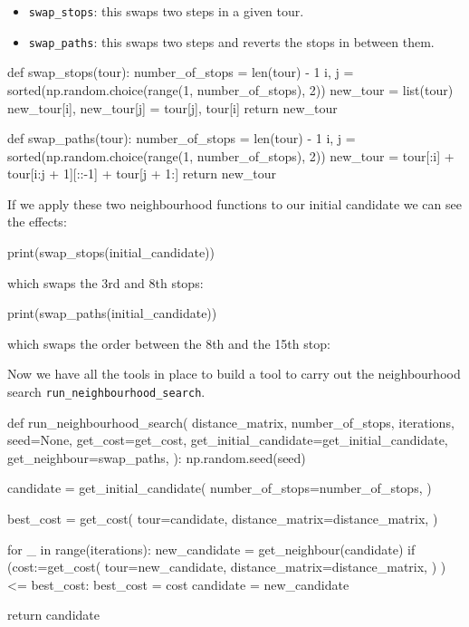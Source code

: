 \begin{itemize}
    \item \texttt{swap_stops}: this swaps two steps in a given tour.
    \item \texttt{swap_paths}: this swaps two steps and reverts the
        stops in between them.
\end{itemize}

\begin{pyin}
def swap_stops(tour):
    number_of_stops = len(tour) - 1
    i, j = sorted(np.random.choice(range(1, number_of_stops), 2))
    new_tour = list(tour)
    new_tour[i], new_tour[j] = tour[j], tour[i]
    return new_tour

def swap_paths(tour):
    number_of_stops = len(tour) - 1
    i, j = sorted(np.random.choice(range(1, number_of_stops), 2))
    new_tour = tour[:i] + tour[i:j + 1][::-1] + tour[j + 1:]
    return new_tour
\end{pyin}

If we apply these two neighbourhood functions to our initial candidate we can
see the effects:

\begin{pyin}
print(swap_stops(initial_candidate))
\end{pyin}

which swaps the 3rd and 8th stops:

\begin{pyout}
[0, 2, 3, 9, 10, 14, 5, 7, 15, 11, 8, 17, 12, 4, 1, 6, 16, 13, 0]
\end{pyout}

\begin{pyin}
print(swap_paths(initial_candidate))
\end{pyin}

which swaps the order between the 8th and the 15th stop:

\begin{pyout}
[0, 2, 7, 9, 10, 14, 5, 3, 6, 1, 4, 12, 17, 8, 11, 15, 16, 13, 0]
\end{pyout}


Now we have all the tools in place to build a tool to carry out the
neighbourhood search \texttt{run_neighbourhood_search}.

\begin{pyin}
def run_neighbourhood_search(
    distance_matrix,
    number_of_stops,
    iterations,
    seed=None,
    get_cost=get_cost,
    get_initial_candidate=get_initial_candidate,
    get_neighbour=swap_paths,
):
    np.random.seed(seed)

    candidate = get_initial_candidate(
        number_of_stops=number_of_stops,
    )

    best_cost = get_cost(
        tour=candidate,
        distance_matrix=distance_matrix,
    )

    for _ in range(iterations):
        new_candidate = get_neighbour(candidate)
        if (cost:=get_cost(
                    tour=new_candidate,
                    distance_matrix=distance_matrix,
                  )
            ) <= best_cost:
            best_cost = cost
            candidate = new_candidate

    return candidate
\end{pyin}

